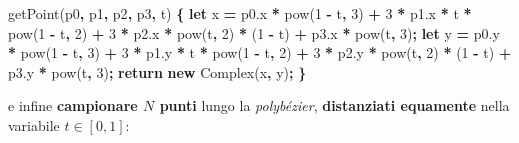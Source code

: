 \documentclass[
]{book}
\newenvironment{Shaded}{\begin{snugshade}}{\end{snugshade}}
\newcommand{\AttributeTok}[1]{\textcolor[rgb]{0.77,0.63,0.00}{#1}}
\newcommand{\ControlFlowTok}[1]{\textcolor[rgb]{0.13,0.29,0.53}{\textbf{#1}}}
\newcommand{\DecValTok}[1]{\textcolor[rgb]{0.00,0.00,0.81}{#1}}
\newcommand{\KeywordTok}[1]{\textcolor[rgb]{0.13,0.29,0.53}{\textbf{#1}}}
\newcommand{\NormalTok}[1]{#1}
\newcommand{\OperatorTok}[1]{\textcolor[rgb]{0.81,0.36,0.00}{\textbf{#1}}}
\newcommand{\VariableTok}[1]{\textcolor[rgb]{0.00,0.00,0.00}{#1}}
\begin{document}
\begin{Shaded}
\begin{Highlighting}[]
\AttributeTok{getPoint}\NormalTok{(p0}\OperatorTok{,}\NormalTok{ p1}\OperatorTok{,}\NormalTok{ p2}\OperatorTok{,}\NormalTok{ p3}\OperatorTok{,}\NormalTok{ t) }\OperatorTok{\{}
  \KeywordTok{let}\NormalTok{ x }\OperatorTok{=} \VariableTok{p0}\NormalTok{.}\AttributeTok{x} \OperatorTok{*} \AttributeTok{pow}\NormalTok{(}\DecValTok{1} \OperatorTok{-}\NormalTok{ t}\OperatorTok{,} \DecValTok{3}\NormalTok{) }\OperatorTok{+} \DecValTok{3} \OperatorTok{*} \VariableTok{p1}\NormalTok{.}\AttributeTok{x} \OperatorTok{*}\NormalTok{ t }\OperatorTok{*} \AttributeTok{pow}\NormalTok{(}\DecValTok{1} \OperatorTok{-}\NormalTok{ t}\OperatorTok{,} \DecValTok{2}\NormalTok{)}
    \OperatorTok{+} \DecValTok{3} \OperatorTok{*} \VariableTok{p2}\NormalTok{.}\AttributeTok{x} \OperatorTok{*} \AttributeTok{pow}\NormalTok{(t}\OperatorTok{,} \DecValTok{2}\NormalTok{) }\OperatorTok{*}\NormalTok{ (}\DecValTok{1} \OperatorTok{-}\NormalTok{ t) }\OperatorTok{+} \VariableTok{p3}\NormalTok{.}\AttributeTok{x} \OperatorTok{*} \AttributeTok{pow}\NormalTok{(t}\OperatorTok{,} \DecValTok{3}\NormalTok{)}\OperatorTok{;}
  \KeywordTok{let}\NormalTok{ y }\OperatorTok{=} \VariableTok{p0}\NormalTok{.}\AttributeTok{y} \OperatorTok{*} \AttributeTok{pow}\NormalTok{(}\DecValTok{1} \OperatorTok{-}\NormalTok{ t}\OperatorTok{,} \DecValTok{3}\NormalTok{) }\OperatorTok{+} \DecValTok{3} \OperatorTok{*} \VariableTok{p1}\NormalTok{.}\AttributeTok{y} \OperatorTok{*}\NormalTok{ t }\OperatorTok{*} \AttributeTok{pow}\NormalTok{(}\DecValTok{1} \OperatorTok{-}\NormalTok{ t}\OperatorTok{,} \DecValTok{2}\NormalTok{)}
    \OperatorTok{+} \DecValTok{3} \OperatorTok{*} \VariableTok{p2}\NormalTok{.}\AttributeTok{y} \OperatorTok{*} \AttributeTok{pow}\NormalTok{(t}\OperatorTok{,} \DecValTok{2}\NormalTok{) }\OperatorTok{*}\NormalTok{ (}\DecValTok{1} \OperatorTok{-}\NormalTok{ t) }\OperatorTok{+} \VariableTok{p3}\NormalTok{.}\AttributeTok{y} \OperatorTok{*} \AttributeTok{pow}\NormalTok{(t}\OperatorTok{,} \DecValTok{3}\NormalTok{)}\OperatorTok{;}
  \ControlFlowTok{return} \KeywordTok{new} \AttributeTok{Complex}\NormalTok{(x}\OperatorTok{,}\NormalTok{ y)}\OperatorTok{;}
\OperatorTok{\}}
\end{Highlighting}
\end{Shaded}

e infine \textbf{campionare \(N\) punti} lungo la \emph{polybézier}, \textbf{distanziati equamente} nella variabile \(t \in [0,1]\):
\end{document}
